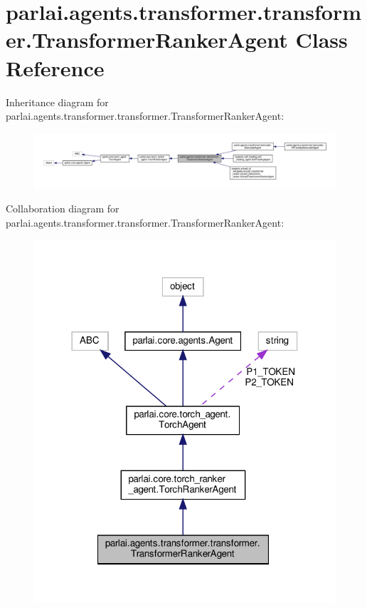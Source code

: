 \hypertarget{classparlai_1_1agents_1_1transformer_1_1transformer_1_1TransformerRankerAgent}{}\section{parlai.\+agents.\+transformer.\+transformer.\+Transformer\+Ranker\+Agent Class Reference}
\label{classparlai_1_1agents_1_1transformer_1_1transformer_1_1TransformerRankerAgent}


Inheritance diagram for parlai.\+agents.\+transformer.\+transformer.\+Transformer\+Ranker\+Agent\+:
\nopagebreak
\begin{figure}[H]
\begin{center}
\leavevmode
\includegraphics[width=350pt]{df/d72/classparlai_1_1agents_1_1transformer_1_1transformer_1_1TransformerRankerAgent__inherit__graph}
\end{center}
\end{figure}


Collaboration diagram for parlai.\+agents.\+transformer.\+transformer.\+Transformer\+Ranker\+Agent\+:
\nopagebreak
\begin{figure}[H]
\begin{center}
\leavevmode
\includegraphics[width=318pt]{d4/d3a/classparlai_1_1agents_1_1transformer_1_1transformer_1_1TransformerRankerAgent__coll__graph}
\end{center}
\end{figure}
